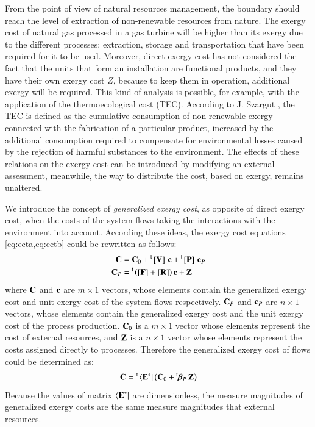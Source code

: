 \documentclass{ecos2018}
\begin{document}
From the point of view of natural resources management, the boundary should reach the level of extraction of non-renewable resources from nature. The exergy cost of natural gas processed in a gas turbine will be higher than its exergy due to the different processes: extraction, storage and transportation that have been required for it to be used.  Moreover, direct exergy cost has not considered the fact that the units that form an installation are functional products, and they have their own exergy cost $Z$, because to keep them in operation, additional exergy will be required.
This kind of analysis is possible, for example, with the application of the thermoecological cost (TEC). According to J. Szargut \cite{Szargut2005}, the TEC is defined as the cumulative consumption of non-renewable exergy connected with the fabrication of a particular product, increased by the additional consumption required to compensate for environmental losses caused by the rejection of harmful substances to the environment. The effects of these relations on the exergy cost can be introduced by modifying an external assessment, meanwhile, the way to distribute the cost, based on exergy, remains unaltered.

We introduce the concept of \emph{generalized exergy cost}, as opposite of direct exergy cost, when the costs of the system flows taking the interactions with the environment into account.
According these ideas, the exergy cost equations \cref{eq:ecta,eq:ectb} could be rewritten as follows:
\begin{align}
\mathbf{C}&=\mathbf{C}_0+\prescript{\smash{\mathsf{t}}}{}{\mskip-1mu}\left[ \textbf{V} \right]\,\mathbf{c}+\prescript{\smash{\mathsf{t}}}{}{\mskip-1mu}\left[ \textbf{P} \right]\,\mathbf{c}_{P}\label{eq:gecta}\\
\mathbf{C}_{P}&=\prescript{\smash{\mathsf{t}}}{}{\mskip-1mu}\left([\mathbf{F}]+[\mathbf{R}]\right)\mathbf{c}+\mathbf{Z}\label{eq:gectb}
\end{align}
where $\mathbf{C}$ and $\mathbf{c}$ are $m\times 1$ vectors, whose elements contain the generalized exergy cost and unit exergy cost of the system flows respectively. $\mathbf{C}_{P}$ and $\mathbf{c}_{P}$ are $n \times1$ vectors, whose elements contain the generalized exergy cost and the unit exergy cost of the process production. $\mathbf{C}_0$ is a $m\times 1$ vector whose elements represent the cost of external resources, and $\mathbf{Z}$ is a $n\times 1$ vector whose elements represent the costs assigned directly to processes.
Therefore the generalized exergy cost of flows could be determined as:
\begin{equation}
\mathbf{C}=\prescript{\smash{\mathsf{t}}}{}{\mskip-1mu}\left\langle {\textbf{E}^\ast } \right|\left( \mathbf{C}_0 + \prescript{\smash{\mathsf{t}}}{}{\mskip-1mu}\bm{\beta}_P\,\mathbf{Z}\right )
\end{equation}
Because the values of matrix $\left\langle {\textbf{E}^\ast } \right|$ are dimensionless, the measure magnitudes of generalized exergy costs are the same measure magnitudes that external resources.
\end{document}
